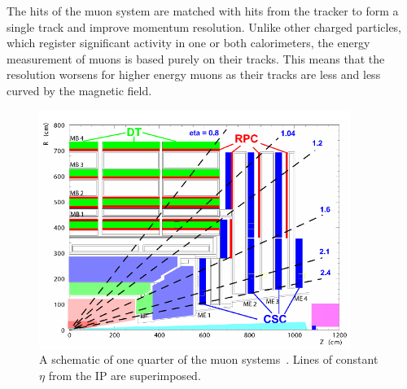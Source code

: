 The hits of the muon system are matched with hits from the tracker to form a single track and
improve momentum resolution. Unlike other charged particles, which register significant activity in
one or both calorimeters, the energy measurement of muons is based purely on their tracks. This means
that the resolution worsens for higher energy muons as their tracks are less and less curved by
the magnetic field.


\begin{figure}[ht]
 \begin{center}
   \includegraphics[width=0.90\textwidth]{figures/experiment/muons.pdf}
      \end{center}
\caption{A schematic of one quarter of the muon systems~\cite{Chatrchyan:2008zzk}.
Lines of constant $\eta$ from the IP are superimposed.}
\label{fig:muonsystem}
\end{figure}


